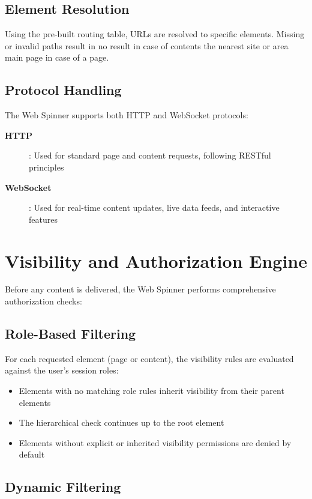 \subsection{Element Resolution}

Using the pre-built routing table, URLs are resolved to specific \wbdl{} elements. Missing or invalid paths result in no result in case of contents the nearest site or area main page in case of a page.

\subsection{Protocol Handling}

The Web Spinner supports both HTTP and WebSocket protocols:
\begin{description}
    \item[\textbf{HTTP}]: Used for standard page and content requests, following RESTful principles
    \item[\textbf{WebSocket}]: Used for real-time content updates, live data feeds, and interactive features
\end{description}

\section{Visibility and Authorization Engine}
\label{sec:authorization-engine}

Before any content is delivered, the Web Spinner performs comprehensive authorization checks:

\subsection{Role-Based Filtering}

For each requested element (page or content), the visibility rules are evaluated against the user's session roles:
\begin{itemize}
    \item Elements with no matching role rules inherit visibility from their parent elements
    \item The hierarchical check continues up to the root element
    \item Elements without explicit or inherited visibility permissions are denied by default
\end{itemize}

\subsection{Dynamic Filtering}

